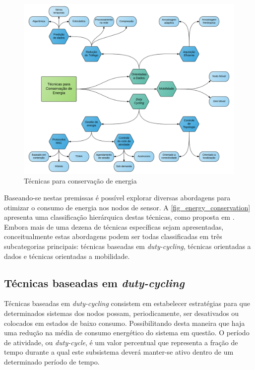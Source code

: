 \documentclass[
	12pt,				%
	openright,			%
	oneside,
	a4paper,			%
	english,			%
	french,				%
	spanish,			%
	brazil				%
	]{abntex2}
\begin{document}
\begin{figure}[htb]
	\caption{\label{fig_energy_conservation}Técnicas para conservação de energia}
	\begin{center}
		\includegraphics[width=\linewidth]{EnergyConservation}
	\end{center}
\end{figure}

Baseando-se nestas premissas é possível explorar diversas abordagens para otimizar o consumo de energia nos nodos de sensor. A \autoref{fig_energy_conservation} apresenta uma classificação hierárquica destas técnicas, como proposta em \cite{Anastasi2009}. Embora mais de uma dezena de técnicas específicas sejam apresentadas, conceitualmente estas abordagens podem ser todas classificadas em três subcategorias principais: técnicas baseadas em \textit{duty-cycling}, técnicas orientadas a dados e técnicas orientadas a mobilidade.

\subsection{Técnicas baseadas em \textit{duty-cycling}}

Técnicas baseadas em \textit{duty-cycling} consistem em estabelecer estratégias para que determinados sistemas dos nodos possam, periodicamente, ser desativados ou colocados em estados de baixo consumo. Possibilitando desta maneira que haja uma redução na média de consumo energético do sistema em questão. O período de atividade, ou \textit{duty-cycle}, é um valor percentual que representa a fração de tempo durante a qual este subsistema deverá manter-se ativo dentro de um determinado período de tempo.
\end{document}
